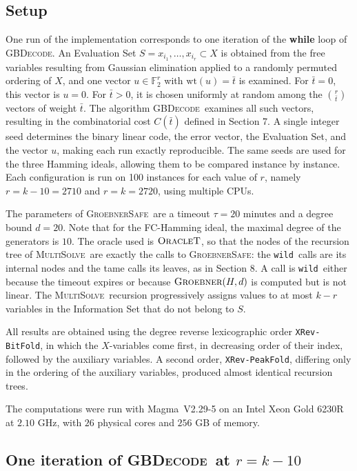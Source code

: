 \documentclass{amsart}
\def\FF{{\mathbb F}}
\def\wt{{\mathrm{wt}}}
\def\GB{{\textsc{Groebner}}}
\def\GBSafe{{\textsc{GroebnerSafe}}}
\def\MultiSolve{{\textsc{MultiSolve}}}
\def\GBDecode{{\textsc{GBDecode}}}
\def\OracleT{{\textsc{OracleT}}}
\def\wild{{\tt wild}}
\def\bt{{\bar{t}}}
\def\Magma{{\sc Magma}}
\begin{document}
\subsection*{Setup}

One run of the implementation corresponds to one iteration of the \textbf{while} loop
of \GBDecode. An Evaluation Set $S = {x_{i_1},\ldots,x_{i_r}}\subset X$ is obtained from
the free variables resulting from Gaussian elimination applied to a randomly permuted
ordering of $X$, and one vector $u\in\FF_2^r$ with $\wt(u) = \bt$ is examined. For $\bt = 0$,
this vector is $u = 0$. For $\bt > 0$, it is chosen uniformly at random among the
$\binom{r}{\bt}$ vectors of weight $\bt$. The algorithm \GBDecode\ examines all such vectors,
resulting in the combinatorial cost $C(\bt)$ defined in Section 7. A single integer seed
determines the binary linear code, the error vector, the Evaluation Set, and the vector $u$,
making each run exactly reproducible. The same seeds are used for the three Hamming ideals,
allowing them to be compared instance by instance. Each configuration is run on 100 instances
for each value of $r$, namely $r = k - 10 = 2710$ and $r = k = 2720$, using multiple CPUs.

The parameters of \GBSafe\ are a timeout $\tau = 20$ minutes and a degree bound $d = 20$.
Note that for the FC-Hamming ideal, the maximal degree of the generators is $10$.
The oracle used is $\OracleT$, so that the nodes of the recursion tree of \MultiSolve\
are exactly the calls to \GBSafe: the \wild\ calls are its internal nodes and the tame
calls its leaves, as in Section 8. A call is \wild\ either because the timeout expires
or because $\GB(H,d)$ is computed but is not linear. The \MultiSolve\ recursion progressively
assigns values to at most $k - r$ variables in the Information Set that do not belong to $S$.

All results are obtained using the degree reverse lexicographic order {\tt XRev-BitFold},
in which the $X$-variables come first, in decreasing order of their index, followed by
the auxiliary variables. A second order, {\tt XRev-PeakFold}, differing only in the ordering
of the auxiliary variables, produced almost identical recursion trees.

The computations were run with \Magma\ V2.29-5 on an Intel Xeon Gold 6230R at $2.10$ GHz, with
$26$ physical cores and $256$ GB of memory.

\subsection*{One iteration of \GBDecode\ at $r = k - 10$}
\end{document}
